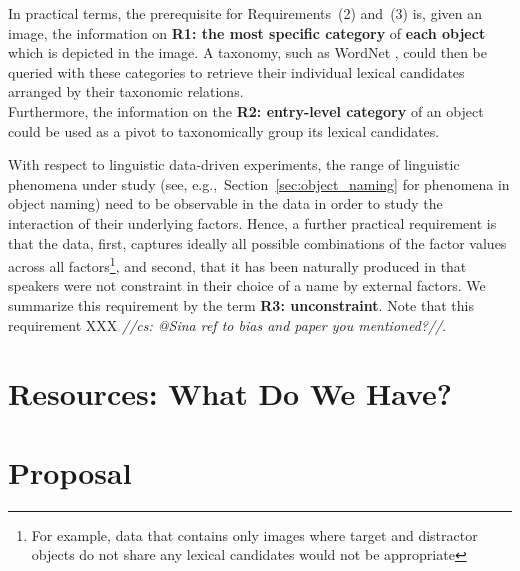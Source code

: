 \documentclass[runningheads]{llncs}
\newcommand{\cs}[1]{\textcolor{PineGreen}{\emph{//cs: #1//}}}
\begin{document}
In practical terms, the prerequisite for Requirements~(2) and~(3) is, given an image, the information on \textbf{R1: the most specific category} of \textbf{each object} which is depicted in the image. 
A taxonomy, such as WordNet \cite{fellbaum1998wordnet}, could then be queried with these categories to retrieve their individual lexical candidates arranged by their taxonomic relations. \\
Furthermore, the information on the \textbf{R2: entry-level category} of an object could be used as a pivot to taxonomically group its lexical candidates.  

With respect to linguistic data-driven experiments, the range of linguistic phenomena under study (see, e.g.,~Section~\ref{sec:object_naming} for phenomena in object naming) need to be observable in the data in order to study the interaction of their underlying factors. 
Hence, a further practical requirement is that the data, first, captures ideally all possible combinations of the factor values across all factors\footnote{For example, data that contains only images where target and distractor objects do not share any lexical candidates would not be appropriate}, and second, that it has been naturally produced in that speakers were not constraint in their choice of a name by external factors. 
We summarize this requirement by the term \textbf{R3: unconstraint}. 
Note that this requirement XXX \cs{@Sina ref to bias and paper you mentioned?}.
\section{Resources: What Do We Have?}
\label{sec:resources}



\section{Proposal}
%


\clearpage


\end{document}
